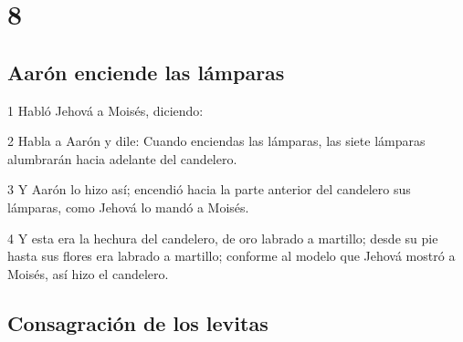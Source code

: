 \chapter{8}

\section*{Aarón enciende las lámparas}

\par 1 Habló Jehová a Moisés, diciendo:
\par 2 Habla a Aarón y dile: Cuando enciendas las lámparas, las siete lámparas alumbrarán hacia adelante del candelero.
\par 3 Y Aarón lo hizo así; encendió hacia la parte anterior del candelero sus lámparas, como Jehová lo mandó a Moisés.
\par 4 Y esta era la hechura del candelero, de oro labrado a martillo; desde su pie hasta sus flores era labrado a martillo; conforme al modelo que Jehová mostró a Moisés, así hizo el candelero.

\section*{Consagración de los levitas}

